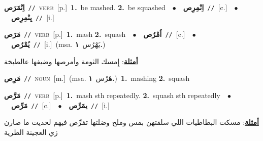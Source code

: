 \documentclass[10pt,a4paper,twoside]{article} %
\begin{document}
\begin{multicols}{2}
{\setlength\topsep{0pt}\textbf{\foreignlanguage{arabic}{اِنْمَرَص}}\ {\color{gray}\texttt{//}\color{black}}\ \textsc{verb}\ [p.]\ \textbf{1.}~be mashed.  \textbf{2.}~be squashed\ \ $\bullet$\ \ \setlength\topsep{0pt}\textbf{\foreignlanguage{arabic}{اِنْمِرِص}}\ {\color{gray}\texttt{//}\color{black}}\ [c.]\ \ $\bullet$\ \ \setlength\topsep{0pt}\textbf{\foreignlanguage{arabic}{يِنْمِرِص}}\ {\color{gray}\texttt{//}\color{black}}\ [i.]\ } \vspace{2mm}

{\setlength\topsep{0pt}\textbf{\foreignlanguage{arabic}{مَرَص}}\ {\color{gray}\texttt{//}\color{black}}\ \textsc{verb}\ [p.]\ \textbf{1.}~mash  \textbf{2.}~squash\ \ $\bullet$\ \ \setlength\topsep{0pt}\textbf{\foreignlanguage{arabic}{اُمْرُص}}\ {\color{gray}\texttt{//}\color{black}}\ [c.]\ \ $\bullet$\ \ \setlength\topsep{0pt}\textbf{\foreignlanguage{arabic}{يُمْرُص}}\ {\color{gray}\texttt{//}\color{black}}\ [i.]\ \color{gray}(msa. \foreignlanguage{arabic}{يَهْرُس}~\foreignlanguage{arabic}{\textbf{١.}})\color{black}\  \begin{flushright}\color{gray}\foreignlanguage{arabic}{\textbf{\underline{\foreignlanguage{arabic}{أمثلة}}}: إِمسك الثومة وأمرصها وضيفها عالطبخة}\end{flushright}\color{black}} \vspace{2mm}

{\setlength\topsep{0pt}\textbf{\foreignlanguage{arabic}{مَرِص}}\ {\color{gray}\texttt{//}\color{black}}\ \textsc{noun}\ [m.]\ \color{gray}(msa. \foreignlanguage{arabic}{هَرْس}~\foreignlanguage{arabic}{\textbf{١.}})\color{black}\ \textbf{1.}~mashing  \textbf{2.}~squash\ } \vspace{2mm}

{\setlength\topsep{0pt}\textbf{\foreignlanguage{arabic}{مَرَّص}}\ {\color{gray}\texttt{//}\color{black}}\ \textsc{verb}\ [p.]\ \textbf{1.}~mash sth repeatedly.  \textbf{2.}~squash sth repeatedly\ \ $\bullet$\ \ \setlength\topsep{0pt}\textbf{\foreignlanguage{arabic}{مَرِّص}}\ {\color{gray}\texttt{//}\color{black}}\ [c.]\ \ $\bullet$\ \ \setlength\topsep{0pt}\textbf{\foreignlanguage{arabic}{يمَرِّص}}\ {\color{gray}\texttt{//}\color{black}}\ [i.]\  \begin{flushright}\color{gray}\foreignlanguage{arabic}{\textbf{\underline{\foreignlanguage{arabic}{أمثلة}}}: مسكت البطاطيات اللي سلقتهن بمس وملح وضلتها تمَرِّص فيهم لحديت ما صارن زي العجينة الطرية}\end{flushright}\color{black}} \vspace{2mm}


\end{multicols}
\end{document}

